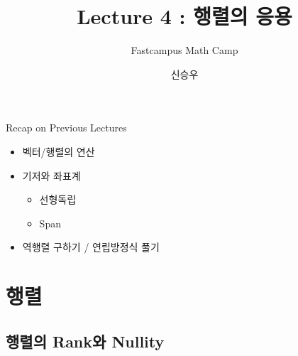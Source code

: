\documentclass{beamer}
\title{Lecture 4 : 행렬의 응용 }
\subtitle{Fastcampus Math Camp}
\author{신승우}
\begin{document}
\begin{frame}
 \titlepage
\end{frame}



\begin{frame}{Recap on Previous Lectures} 

\begin{itemize} 
\item 벡터/행렬의 연산 
\item 기저와 좌표계
\begin{itemize}
\item 선형독립
\item Span
\end{itemize} 
\item 역행렬 구하기 / 연립방정식 풀기 
\end{itemize}
\end{frame}

\section{행렬} 

\subsection{행렬의 Rank와 Nullity} 







\end{document}
